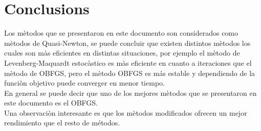 \section{Conclusions}
Los m\`etodos que se presentaron en este documento son considerados como m\`etodos de Quasi-Newton, se puede concluir que existen distintos m\`etodos los cuales son m\`as eficientes en distintas situaciones, por ejemplo el m\`etodo de Levenberg-Maquardt estoc\`astico es m\`as eficiente en cuanto a iteraciones que el m\`etodo de OBFGS, pero el m\`etodo OBFGS es más estable y dependiendo de la funci\`on objetivo puede converger en menor tiempo. \\
%
En general se puede decir que uno de los mejores m\`etodos que se presentaron en este documento es el OBFGS.\\
%
Una observaci\`on interesante es que los m\`etodos modificados ofrecen un mejor rendimiento que el resto de métodos.


%
%
